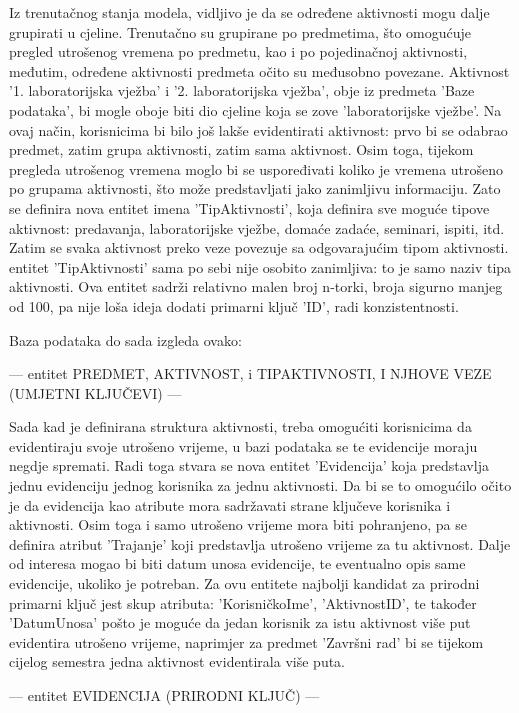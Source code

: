 \documentclass[times, utf8, zavrsni]{fer}
\begin{document}
Iz trenutačnog stanja modela, vidljivo je da se određene aktivnosti mogu dalje grupirati u cjeline. Trenutačno su grupirane po predmetima, što omogućuje pregled utrošenog vremena po predmetu, kao i po pojedinačnoj aktivnosti, međutim, određene aktivnosti predmeta očito su međusobno povezane. Aktivnost '1. laboratorijska vježba' i '2. laboratorijska vježba', obje iz predmeta 'Baze podataka', bi mogle oboje biti dio cjeline koja se zove 'laboratorijske vježbe'. Na ovaj način, korisnicima bi bilo još lakše evidentirati aktivnost: prvo bi se odabrao predmet, zatim grupa aktivnosti, zatim sama aktivnost. Osim toga, tijekom pregleda utrošenog vremena moglo bi se uspoređivati koliko je vremena utrošeno po grupama aktivnosti, što može predstavljati jako zanimljivu informaciju. Zato se definira nova entitet imena 'TipAktivnosti', koja definira sve moguće tipove aktivnost: predavanja, laboratorijske vježbe, domaće zadaće, seminari, ispiti, itd.
Zatim se svaka aktivnost preko veze povezuje sa odgovarajućim tipom aktivnosti. entitet 'TipAktivnosti' sama po sebi nije osobito zanimljiva: to je samo naziv tipa aktivnosti. Ova entitet sadrži relativno malen broj n-torki, broja sigurno manjeg od 100, pa nije loša ideja dodati primarni ključ 'ID', radi konzistentnosti.

Baza podataka do sada izgleda ovako:

--- entitet PREDMET, AKTIVNOST, i TIPAKTIVNOSTI, I NJHOVE VEZE (UMJETNI KLJUČEVI) ---

Sada kad je definirana struktura aktivnosti, treba omogućiti korisnicima da evidentiraju svoje utrošeno vrijeme, u bazi podataka se te evidencije moraju negdje spremati. Radi toga stvara se nova entitet 'Evidencija' koja predstavlja jednu evidenciju jednog korisnika za jednu aktivnosti. Da bi se to omogućilo očito je da evidencija kao atribute mora sadržavati strane ključeve korisnika i aktivnosti. Osim toga i samo utrošeno vrijeme mora biti pohranjeno, pa se definira atribut 'Trajanje' koji predstavlja utrošeno vrijeme za tu aktivnost. Dalje od interesa mogao bi biti datum unosa evidencije, te eventualno opis same evidencije, ukoliko je potreban. Za ovu entitete najbolji kandidat za prirodni primarni ključ jest skup atributa: 'KorisničkoIme', 'AktivnostID', te također 'DatumUnosa' pošto je moguće da jedan korisnik za istu aktivnost više put evidentira utrošeno vrijeme, naprimjer za predmet 'Završni rad' bi se tijekom cijelog semestra jedna aktivnost evidentirala više puta.

--- entitet EVIDENCIJA (PRIRODNI KLJUČ) ---
\end{document}
